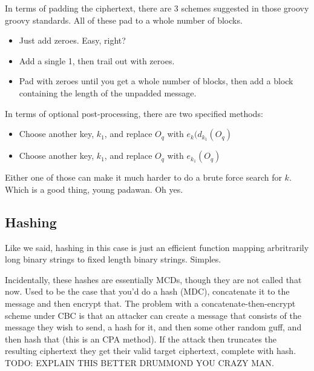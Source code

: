     In terms of padding the ciphertext, there are 3 schemes suggested in those groovy groovy standards. All of these pad to a whole number of blocks.
    \begin{itemize}
        \item Just add zeroes. Easy, right?
        \item Add a single 1, then trail out with zeroes.
        \item Pad with zeroes until you get a whole number of blocks, then add a block containing the length of the unpadded message.
    \end{itemize}

    In terms of optional post-processing, there are two specified methods:
    \begin{itemize}
        \item Choose another key, $k_{1}$, and replace $O_{q}$ with $e_{k}(d_{k_{1}}(O_{q})$
        \item Choose another key, $k_{1}$, and replace $O_{q}$ with $e_{k_{1}}(O_{q})$ 
    \end{itemize}

    Either one of those can make it much harder to do a brute force search for $k$. Which is a good thing, young padawan. Oh yes.

    \subsection{Hashing}
    Like we said, hashing in this case is just an efficient function mapping arbritrarily long binary strings to fixed length binary strings. Simples.

    Incidentally, these hashes are essentially MCDs, though they are not called that now. Used to be the case that you'd do a hash (MDC), concatenate it to the message and then encrypt that. The problem with a concatenate-then-encrypt scheme under CBC is that an attacker can create a message that consists of the message they wish to send, a hash for it, and then some other random guff, and then hash that (this is an CPA method). If the attack then truncates the resulting ciphertext they get their valid target ciphertext, complete with hash. TODO: EXPLAIN THIS BETTER DRUMMOND YOU CRAZY MAN.
    
